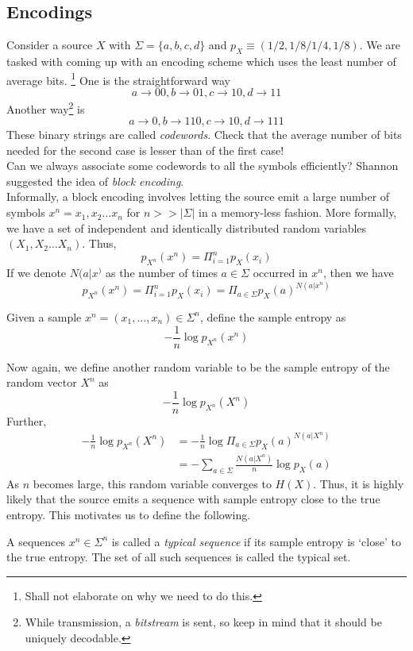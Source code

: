 \subsection{Encodings}
Consider a source $X$ with $\Sigma = \{a,b,c,d\}$ and $p_X\equiv (1/2,1/8/1/4,1/8)$. We are tasked with coming up with an encoding scheme which uses the least number of average bits. \footnote{Shall not elaborate on why we need to do this.} One is the straightforward way
\[a\to00,b\to01,c\to10,d\to11\]
Another way\footnote{While transmission, a \textit{bitstream} is sent, so keep in mind that it should be uniquely decodable.} is
\[a\to0,b\to110,c\to10,d\to111\]
These binary strings are called \textit{codewords}. Check that the average number of bits needed for the second case is lesser than of the first case! \\\noindent 
Can we always associate some codewords to all the symbols efficiently? Shannon suggested the idea of \textit{block encoding}.
\\\noindent Informally, a block encoding involves letting the source emit a large number of symbols $x^n = x_1,x_2\dots x_n$ for $n >{}> |\Sigma|$ in a memory-less fashion. More formally, we have a set of independent and identically distributed random variables $(X_1,X_2\dots X_n)$. Thus,
\[p_{X^n}(x^n) = \Pi_{i=1}^np_X(x_i)\]
If we denote $N(a|x^)$ as the number of times $a\in\Sigma$ occurred in $x^n$, then we have
\[p_{X^n}(x^n) = \Pi_{i=1}^np_X(x_i) = \Pi_{a\in\Sigma}p_X(a)^{N(a|x^n)}\]
\begin{definition}
Given a sample $x^n = (x_1,\dots,x_n) \in \Sigma^n$, define the sample entropy as 
\[-\frac{1}{n}\log{p_{X^n}(x^n)}\]
\end{definition}
Now again, we define another random variable to be the sample entropy of the random vector $X^n$ as
\[-\frac{1}{n}\log{p_{X^n}(X^n)}\]
Further,
\begin{align*}
    -\frac{1}{n}\log{p_{X^n}(X^n)} &= -\frac{
    1}{n}\log{\Pi_{a\in\Sigma}p_X(a)^{N(a|X^n)}} \\ 
    &= -\sum_{a\in\Sigma}\frac{N(a|X^n)}{n}\log{p_X(a)}
\end{align*}
As $n$ becomes large, this random variable converges to $H(X)$. Thus, it is highly likely that the source emits a sequence with sample entropy close to the true entropy. This motivates us to define the following.
\begin{definition}
A sequences $x^n \in \Sigma^n$ is called a \textit{typical sequence} if its sample entropy is `close' to the true entropy. The set of all such sequences is called the typical set.
\end{definition}
